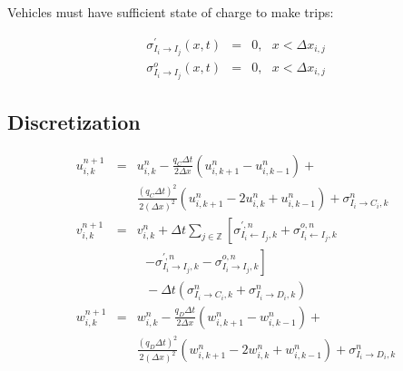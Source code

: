 \documentclass[journal]{IEEEtran}
\begin{document}
Vehicles must have sufficient state of charge to make trips:

\begin{eqnarray*}
    \sigma_{I_i \rightarrow I_j}^\prime(x,t) & = & 0, ~~~ x < \Delta x_{i,j} \\
    \sigma_{I_i \rightarrow I_j}^o(x,t) & = & 0, ~~~ x < \Delta x_{i,j}
\end{eqnarray*}



\subsection{Discretization}

\begin{eqnarray*}
    u_{i,k}^{n+1} &=& u_{i,k}^{n} - \frac{q_C \Delta t}{2 \Delta x}\left(u_{i,k+1}^{n} - u_{i,k-1}^{n} \right) + \\
    && \frac{(q_C \Delta t)^2}{2 (\Delta x)^2}\left(u_{i,k+1}^{n} - 2u_{i,k}^{n} + u_{i,k-1}^{n} \right) + \sigma_{I_i \rightarrow C_i,k}^n \\
    v_{i,k}^{n+1} &=& v_{i,k}^{n} + \Delta t \sum_{j\in\mathbb{Z}} \left[ \sigma_{I_i \leftarrow I_j,k}^{\prime,n} + \sigma_{I_i \leftarrow I_j,k}^{o,n} \right. \\
    & & ~~~ \left. - \sigma_{I_i \rightarrow I_j,k}^{\prime,n} - \sigma_{I_i \rightarrow I_j,k}^{o,n} \right] \\
    && ~~~ - \Delta t \left( \sigma_{I_i \rightarrow C_i,k}^n + \sigma_{I_i \rightarrow D_i,k}^n \right) \\
    w_{i,k}^{n+1} &=& w_{i,k}^{n} - \frac{q_D \Delta t}{2 \Delta x}\left(w_{i,k+1}^{n} - w_{i,k-1}^{n} \right) + \\
    && \frac{(q_D \Delta t)^2}{2 (\Delta x)^2}\left(w_{i,k+1}^{n} - 2w_{i,k}^{n} + w_{i,k-1}^{n} \right) + \sigma_{I_i \rightarrow D_i,k}^n \\   
\end{eqnarray*}


%
%
\end{document}
